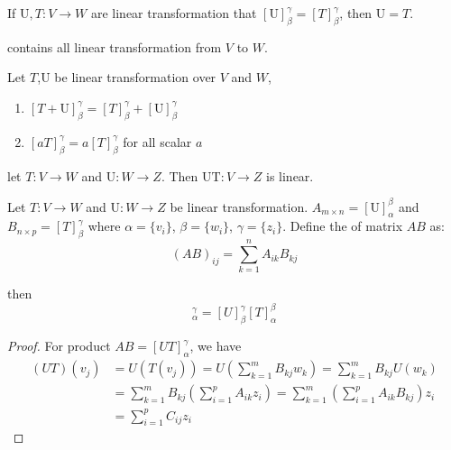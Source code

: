 \begin{theorem}
	If $\mathrm{U},T:V \rightarrow W$ are linear transformation that $[\mathrm{U}]_\beta^\gamma = [T]_\beta^\gamma$, then $\mathrm{U} = T$.
\end{theorem}

\begin{definition}
	 contains all linear transformation from $V$ to $W$.
\end{definition}

\begin{theorem}
	Let $T$,$\mathrm{U}$ be linear transformation over $V$ and $W$, 
	\begin{enumerate}
		\item $[T + \mathrm{U}]_\beta^\gamma = [T]_\beta^\gamma  + [\mathrm{U}]_\beta^\gamma $
		\item $[a T ]_\beta^\gamma = a[T]_\beta^\gamma $ for all scalar $a$
	\end{enumerate}
\end{theorem}

\begin{theorem}
	let $T:V\rightarrow W$ and $\mathrm{U}:W\rightarrow Z$. Then $\mathrm{UT}: V \rightarrow Z$ is linear.
\end{theorem}

\begin{definition}
	Let $T:V\rightarrow W$ and $\mathrm{U}:W\rightarrow Z$ be linear transformation. $A_{m \times n}=[\mathrm{U}]_\alpha^\beta$ and $B_{n \times p}=[T]_\beta^\gamma$ where $\alpha=\{v_i\}$, $\beta=\{w_i\}$, $\gamma=\{z_i\}$. Define the  of matrix $AB$ as:
	\begin{equation}
		(AB)_{ij} = \sum_{k=1}^n A_{ik} B_{kj}
	\end{equation}
	
	then 
	\begin{equation}
	    [UT]_\alpha^\gamma = [U]_\beta^\gamma [T]_\alpha^\beta
	\end{equation}
\end{definition}

\begin{proof}
	For product $AB=[UT]_\alpha^\gamma$, we have 
	\begin{equation}
		\begin{aligned}
			(UT)(v_j) &= U(T(v_j)) = U \left( \sum_{k=1}^m B_{kj} w_k \right) = \sum_{k=1}^m B_{kj} U(w_k) \\
			&= \sum_{k=1}^m B_{kj} \left( \sum_{i=1}^p A_{ik} z_i \right) = \sum_{k=1}^m  \left( \sum_{i=1}^p A_{ik} B_{kj} \right)  z_i \\
			&= \sum_{i=1}^p C_{ij} z_i
		\end{aligned}
	\end{equation}
\end{proof}


